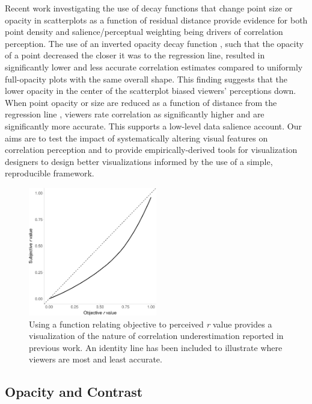 \documentclass[manuscript, review, anonymous, screen]{acmart}
\begin{document}
Recent work investigating the use of decay functions that change point
size or opacity in scatterplots as a function of residual distance
provide evidence for both point density and salience/perceptual
weighting being drivers of correlation perception. The use of an
inverted opacity decay function \citep{strain_2023}, such that the
opacity of a point decreased the closer it was to the regression line,
resulted in significantly lower and less accurate correlation estimates
compared to uniformly full-opacity plots with the same overall shape.
This finding suggests that the lower opacity in the center of the
scatterplot biased viewers' perceptions down. When point opacity or size
are reduced as a function of distance from the regression line
\citep{strain_2023, strain_2023b}, viewers rate correlation as
significantly higher and are significantly more accurate. This supports
a low-level data salience account. Our aims are to test the impact of
systematically altering visual features on correlation perception and to
provide empirically-derived tools for visualization designers to design
better visualizations informed by the use of a simple, reproducible
framework.

\begin{figure}

\includegraphics[width=0.5\textwidth,height=\textheight]{size_and_opacity_files/figure-pdf/fig-underestimation-curve-1.pdf} \hfill{}

\caption{\label{fig-underestimation-curve}Using a function relating
objective to perceived \emph{r} value \citep{rensink_2017} provides a
visualization of the nature of correlation underestimation reported in
previous work. An identity line has been included to illustrate where
viewers are most and least accurate.}

\end{figure}

\hypertarget{sec-transparency-and-contrast}{%
\subsection{Opacity and Contrast}\label{sec-transparency-and-contrast}}
\end{document}

